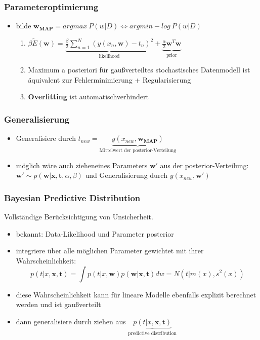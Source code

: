 	\subsubsection{Parameteroptimierung}
	\begin{itemize}
		\item bilde $\pmb{w_{MAP}} = argmax~ P(w\vert D) \Leftrightarrow argmin -log~P(w\vert D)$
		\begin{enumerate}[$\hookrightarrow$]
			\item $\beta\tilde{E}(\pmb{w}) = \underbrace{\frac{\beta}{2}\sum_{n=1}^N(y(x_n, \pmb{w})-t_n)^2}_\text{likelihood}+ \underbrace{\frac{\alpha}{2}\pmb{w}^T\pmb{w}}_\text{prior}$
			\item Maximum a posteriori für gaußverteiltes stochastisches Datenmodell ist äquivalent zur Fehlerminimierung + Regularisierung
			\item \textbf{Overfitting} ist \dq automatisch\dq verhindert
		\end{enumerate}
	\end{itemize}
	\subsubsection{Generalisierung}
	\begin{itemize}
		\item Generalisiere durch $t_{new} = \underbrace{y(x_{new}, \pmb{w_{MAP}})}_\text{Mittelwert der posterior-Verteilung}$
		\item möglich wäre auch \dq ziehen\dq eines Parameters $\pmb{w'}$ aus der posterior-Verteilung: $\pmb{w'} \sim p(\pmb{w}\vert \pmb{x}, \pmb{t}, \alpha, \beta)$ und Generalisierung durch $y(x_{new}, \pmb{w'})$
	\end{itemize}
	\subsubsection{Bayesian Predictive Distribution}
	Vollständige Berücksichtigung von Unsicherheit.
	\begin{itemize}
		\item bekannt: Data-Likelihood und Parameter posterior
		\item integriere über alle möglichen Parameter gewichtet mit ihrer Wahrscheinlichkeit:
		\begin{equation*}
			p(t\vert x, \pmb{x}, \pmb{t}) = \int p(t\vert x, \pmb{w})p(\pmb{w}\vert \pmb{x}, \pmb{t}) dw = N(t\vert m(x), s^2(x))
		\end{equation*}
		\item diese Wahrscheinlichkeit kann für lineare Modelle ebenfalls explizit berechnet werden und ist gaußverteilt
		\item dann generalisiere durch ziehen aus $\underbrace{p(t\vert x, \pmb{x}, \pmb{t})}_\text{predictive distribution}$
	\end{itemize}
